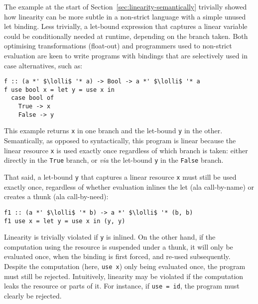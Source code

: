 \documentclass[acmsmall,review,anonymous,screen]{acmart}
\newcommand{\lolli}{\multimap}
\begin{document}
The example at the start of Section~\ref{sec:linearity-semantically}
trivially showed how linearity can be more subtle in a non-strict language with
a simple unused let binding.
%
Less trivially, a let-bound expression that captures a linear variable
could be conditionally needed at runtime, depending on the branch taken.
Both optimising transformations (float-out) and programmers used to
non-strict evaluation are keen to write programs with bindings that are selectively
used in case alternatives, such as:
%
\begin{notyet}
\begin{lstlisting}
f :: (a *' $\lolli$ '* a) -> Bool -> a *' $\lolli$ '* a
f use bool x = let y = use x in
  case bool of
    True -> x 
    False -> y
\end{lstlisting}
\end{notyet}
%
This example returns \lstinline{x} in one branch and the let-bound
\lstinline{y} in the other. Semantically, as opposed to syntactically, this
program is linear %
because the linear resource \lstinline{x} is used exactly once regardless of which branch is
taken: either directly in the \lstinline{True} branch, or \emph{via} the
let-bound \lstinline{y} in the \lstinline{False} branch.

That said, a let-bound \lstinline{y} that captures a linear resource
\lstinline{x} must still be used exactly once, regardless of whether evaluation
inlines the let (ala call-by-name) or creates a thunk (ala call-by-need):
%
%
\begin{noway}
\begin{lstlisting}
f1 :: (a *' $\lolli$ '* b) -> a *' $\lolli$ '* (b, b)
f1 use x = let y = use x in (y, y)
\end{lstlisting}
\end{noway}
%
Linearity is trivially violated if \lstinline{y} is inlined.
%
On the other hand, if the computation using the resource is suspended under a
thunk, it will only be evaluated once, when the binding is first forced, and
re-used subsequently. Despite the computation (here, \lstinline{use x}) only
being evaluated once, the program must still be rejected.
%
Intuitively, linearity may be violated if the computation leaks
the resource or parts of it. For instance, if \lstinline{use = id}, the program
must clearly be rejected.
%
%
%
\end{document}
